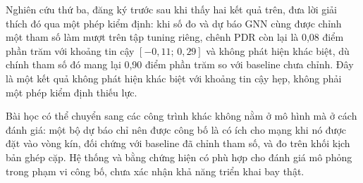 \documentclass[11pt,a4paper]{article}
\begin{document}
Nghiên cứu thứ ba, đăng ký trước sau khi thấy hai kết quả trên, đưa lời giải
thích đó qua một phép kiểm định: khi số đo và dự báo GNN cùng được chỉnh một
tham số làm mượt trên tập tuning riêng, chênh PDR còn lại là 0,08 điểm phần
trăm với khoảng tin cậy $[-0{,}11;\,0{,}29]$ và không phát hiện khác biệt, dù
chính tham số đó mang lại 0,90 điểm phần trăm so với baseline chưa chỉnh. Đây
là một kết quả không phát hiện khác biệt với khoảng tin cậy hẹp, không phải một
phép kiểm định thiếu lực.

Bài học có thể chuyển sang các công trình khác không nằm ở mô hình mà ở cách
đánh giá: một bộ dự báo chỉ nên được công bố là có ích cho mạng khi nó được đặt
vào vòng kín, đối chứng với baseline đã chỉnh tham số, và đo trên khối kịch bản
ghép cặp. Hệ thống và bằng chứng hiện có phù hợp cho đánh giá mô phỏng trong
phạm vi công bố, chưa xác nhận khả năng triển khai bay thật.
\end{document}
